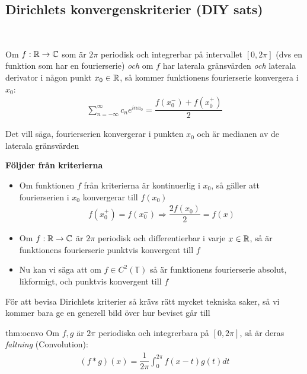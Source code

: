 \subsection{Dirichlets konvergenskriterier (DIY sats)}\hfill\\\par
\noindent Om $f:\mathbb{R}\to\mathbb{C}$ som är $2\pi$ periodisk och integrerbar på intervallet $[0,2\pi]$ (dvs en funktion som har en fourierserie) \textit{och} om $f$ har laterala gränsvärden \textit{och} laterala derivator i någon punkt $x_0\in\mathbb{R}$, så kommer funktionens fourierserie konvergera i $x_0$:
\begin{equation*}
  \begin{gathered}
    \sum_{n=-\infty}^{\infty}c_ne^{inx_0} = \dfrac{f(x_0^-)+f(x_0^+)}{2}
  \end{gathered}
\end{equation*}
\par\bigskip
\noindent Det vill säga, fourierserien konvergerar i punkten $x_0$ och är medianen av de laterala gränsvärden
\par\bigskip
\noindent\textbf{Följder från kriterierna}\par
\begin{itemize}
  \item Om funktionen $f$ från kriterierna är kontinuerlig i $x_0$, så gäller att fourierserien i $x_0$ konvergerar till $f(x_0)$ 
    \begin{equation*}
      \begin{gathered}
        f(x_0^+) = f(x_0^-)\Rightarrow \dfrac{2f(x_0)}{2} = f(x)
      \end{gathered}
    \end{equation*}
    \par\bigskip
  \item Om $f:\mathbb{R}\to\mathbb{C}$ är $2\pi$ periodisk och differentierbar i varje $x\in\mathbb{R}$, så är funktionens fourierserie punktvis konvergent till $f$
    \par\bigskip
  \item Nu kan vi säga att om $f\in C^2(\mathbb{T})$ så är funktionens fourierserie absolut, likformigt, och punktvis konvergent till $f$
    \par\bigskip
\end{itemize}
\par\bigskip
\noindent För att bevisa Dirichlets kriterier så krävs rätt mycket tekniska saker, så vi kommer bara ge en generell bild över hur beviset går till
\par\bigskip
\begin{theo}{thm:ocnvo}
  Om $f,g$ är $2\pi$ periodiska och integrerbara på $[0,2\pi]$, så är deras \textit{faltning} (Convolution):
  \begin{equation*}
    \begin{gathered}
      (f*g)(x) = \dfrac{1}{2\pi}\int_{0}^{2\pi}f(x-t)g(t)dt
    \end{gathered}
  \end{equation*}
\end{theo}
